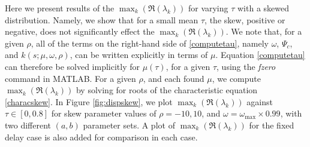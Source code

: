 Here we present results of the $\max_k(\Re(\lambda_k))$ for varying $\tau$ with a skewed distribution. Namely, we show that for a small mean $\tau$, the skew, positive or negative, does not significantly effect the $\max_k(\Re(\lambda_k))$. We note that, for a given $\rho$, all of the terms on the right-hand side of \eqref{computetau}, namely $\omega$, $\Psi_c$,  and $k(s;\mu,\omega,\rho)$, can be written explicitly in terms of $\mu$. Equation \eqref{computetau} can therefore be solved implicitly for $\mu(\tau)$, for a given $\tau$, using the \textit{fzero} command in MATLAB. For a given $\rho$, and each found $\mu$, we compute $\max_k(\Re(\lambda_k))$ by solving for roots of the characteristic equation \eqref{characskew}. In Figure \ref{fig:dispskew}, we plot $\max_k(\Re(\lambda_k))$ against $\tau\in[0,0.8]$ for skew parameter values of $\rho=-10,10$, and $\omega=\omega_{\max}\times0.99$, with two different $(a,b)$ parameter sets. A plot of $\max_k(\Re(\lambda_k))$ for the fixed delay case is also added for comparison in each case.

